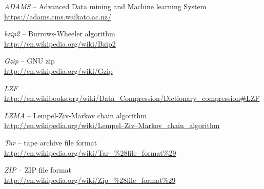 %

\begin{thebibliography}{999}

		\textit{ADAMS} -- Advanced Data mining and Machine learning System \\
		\url{https://adams.cms.waikato.ac.nz/}{}
		
		\textit{bzip2} -- Burrows-Wheeler algorithm \\
		\url{http://en.wikipedia.org/wiki/Bzip2}{}
		
		\textit{Gzip} -- GNU zip \\
		\url{http://en.wikipedia.org/wiki/Gzip}{}
		
		\textit{LZF} \\
		\url{http://en.wikibooks.org/wiki/Data_Compression/Dictionary_compression#LZF}{}
		
		\textit{LZMA} -- Lempel-Ziv-Markov chain algorithm \\
		\url{http://en.wikipedia.org/wiki/Lempel–Ziv–Markov_chain_algorithm}{}
		
		\textit{Tar} -- tape archive file format \\
		\url{http://en.wikipedia.org/wiki/Tar_\%28file_format\%29}{}
		
		\textit{ZIP} -- ZIP file format \\
		\url{http://en.wikipedia.org/wiki/Zip_\%28file_format\%29}{}

\end{thebibliography}
